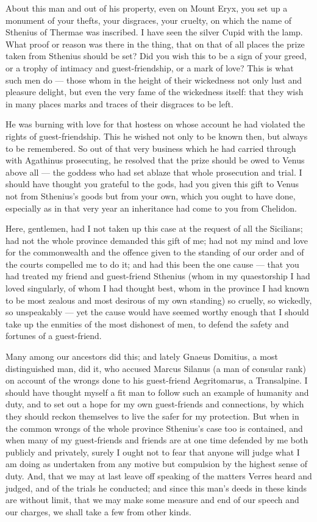  About this man and out of his property, even on Mount Eryx, you set up a monument of your thefts, your disgraces, your cruelty, on which the name of Sthenius of Thermae was inscribed. I have seen the silver Cupid with the lamp. What proof or reason was there in the thing, that on that of all places the prize taken from Sthenius should be set? Did you wish this to be a sign of your greed, or a trophy of intimacy and guest-friendship, or a mark of love? This is what such men do --- those whom in the height of their wickedness not only lust and pleasure delight, but even the very fame of the wickedness itself: that they wish in many places marks and traces of their disgraces to be left.

 He was burning with love for that hostess on whose account he had violated the rights of guest-friendship. This he wished not only to be known then, but always to be remembered. So out of that very business which he had carried through with Agathinus prosecuting, he resolved that the prize should be owed to Venus above all --- the goddess who had set ablaze that whole prosecution and trial. I should have thought you grateful to the gods, had you given this gift to Venus not from Sthenius's goods but from your own, which you ought to have done, especially as in that very year an inheritance had come to you from Chelidon.

 Here, gentlemen, had I not taken up this case at the request of all the Sicilians; had not the whole province demanded this gift of me; had not my mind and love for the commonwealth and the offence given to the standing of our order and of the courts compelled me to do it; and had this been the one cause --- that you had treated my friend and guest-friend Sthenius (whom in my quaestorship I had loved singularly, of whom I had thought best, whom in the province I had known to be most zealous and most desirous of my own standing) so cruelly, so wickedly, so unspeakably --- yet the cause would have seemed worthy enough that I should take up the enmities of the most dishonest of men, to defend the safety and fortunes of a guest-friend.

 Many among our ancestors did this; and lately Gnaeus Domitius, a most distinguished man, did it, who accused Marcus Silanus (a man of consular rank) on account of the wrongs done to his guest-friend Aegritomarus, a Transalpine. I should have thought myself a fit man to follow such an example of humanity and duty, and to set out a hope for my own guest-friends and connections, by which they should reckon themselves to live the safer for my protection. But when in the common wrongs of the whole province Sthenius's case too is contained, and when many of my guest-friends and friends are at one time defended by me both publicly and privately, surely I ought not to fear that anyone will judge what I am doing as undertaken from any motive but compulsion by the highest sense of duty. And, that we may at last leave off speaking of the matters Verres heard and judged, and of the trials he conducted; and since this man's deeds in these kinds are without limit, that we may make some measure and end of our speech and our charges, we shall take a few from other kinds.

